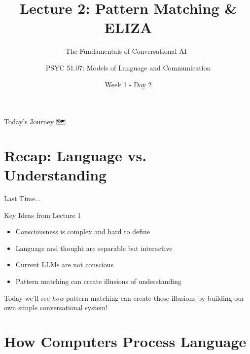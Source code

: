 \documentclass[aspectratio=169]{beamer}
\title{Lecture 2: Pattern Matching \& ELIZA}
\subtitle{The Fundamentals of Conversational AI 🔧}
\author{PSYC 51.07: Models of Language and Communication}
\institute{Dr. Jeremy R. Manning}
\date{Week 1 - Day 2}
\begin{document}
\begin{frame}[shrink=10]
\titlepage
\end{frame}

\begin{frame}[shrink=5]{Today's Journey 🗺️}
\tableofcontents
\end{frame}

\section{Recap: Language vs. Understanding}

\begin{frame}{Last Time... 🔄}
\small
\begin{block}{Key Ideas from Lecture 1}
\begin{itemize}\setlength{\itemsep}{0pt}
    \item Consciousness is complex and hard to define
    \item Language and thought are separable but interactive
    \item Current LLMs are not conscious
    \item Pattern matching can create illusions of understanding
\end{itemize}
\end{block}

\vspace{0.3cm}

\begin{discussion}
Today we'll see \textit{how} pattern matching can create these illusions by building our own simple conversational system!
\end{discussion}
\end{frame}

\section{How Computers Process Language}
\end{document}

